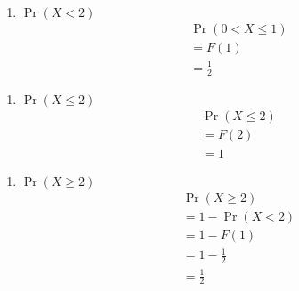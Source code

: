 \documentclass{article}
\providecommand{\pr}[1]{\ensuremath{\Pr\left(#1\right)}}
\begin{document}
\begin{enumerate}
 \begin{enumerate}
        \item \pr{X < 2}
           \begin{align}
              & \pr{0 < X \le 1} \\
              & = F(1)\\
              & = \frac{1}{2}
        \end{align}
\end{enumerate}
\begin{enumerate}
        \item \pr{X \leq 2}
        \begin{align}
            &\pr{X \le 2}\\
            & = F(2)\\
            & = 1   
        \end{align}
\end{enumerate}
\begin{enumerate}
        \item \pr{X \geq 2}
        \begin{align}
            & \pr{X \geq 2}\\
               & = 1-\pr{X < 2} \\
               & = 1 - F(1)\\
               & = 1 - \frac{1}{2}\\
               & = \frac{1}{2}
        \end{align}
    \end{enumerate}
\end{enumerate}
\end{document}

